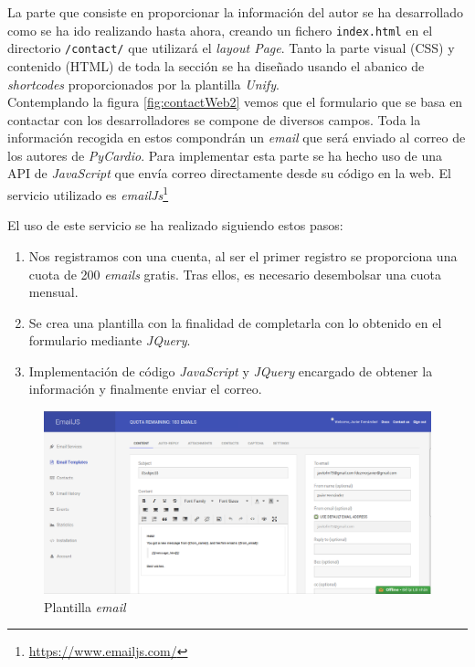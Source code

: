 La parte que consiste en proporcionar la información del autor se ha desarrollado como se ha ido realizando hasta ahora, creando un fichero \texttt{index.html} en el directorio \texttt{/contact/} que utilizará el \textit{layout Page}. Tanto la parte visual (CSS) y contenido (HTML) de toda la sección se ha diseñado usando el abanico de \textit{shortcodes} proporcionados por la plantilla \textit{Unify}. \\

Contemplando la figura  \ref{fig:contactWeb2} vemos que el formulario que se basa en contactar con los desarrolladores se compone de diversos campos. Toda la información recogida en estos compondrán un \textit{email} que será enviado al correo de los autores de \textit{PyCardio}. Para implementar esta parte se ha hecho uso de una API de \textit{JavaScript} que envía correo directamente desde su código en la web. El servicio utilizado es \textit{emailJs}\footnote{\url{https://www.emailjs.com/}}

El uso de este servicio se ha realizado siguiendo estos pasos:
\begin{enumerate}
    \item Nos registramos con una cuenta, al ser el primer registro se proporciona una cuota de 200 \textit{emails} gratis. Tras ellos, es necesario desembolsar una cuota mensual.
    \item Se crea una plantilla con la finalidad de completarla con lo obtenido en el formulario mediante \textit{JQuery}.
    \item Implementación de código \textit{JavaScript} y \textit{JQuery} encargado de obtener la información y finalmente enviar el correo.
\end{enumerate}

\begin{figure}[H]
    \centering
    \includegraphics[width=\textwidth]{img/email_template.png}
    \caption{Plantilla \textit{email}}
    \label{fig:emailTemplate}
\end{figure}

